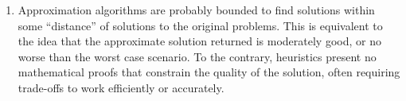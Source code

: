\documentclass[12pt]{article}
\begin{document}
\begin{enumerate}
\begin{enumerate}
    \item Approximation algorithms are probably bounded to find solutions within some ``distance'' of solutions to the original problems. This is equivalent to the idea that the approximate solution returned is moderately good, or no worse than the worst case scenario. To the contrary, heuristics present no mathematical proofs that constrain the quality of the solution, often requiring trade-offs to work efficiently or accurately.
  \end{enumerate}
\end{enumerate}
\end{document}
